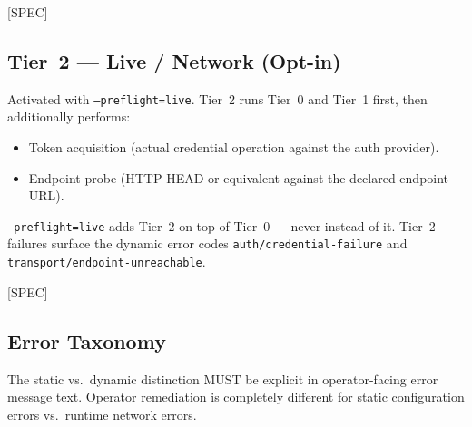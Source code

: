 [SPEC]

\subsection{Tier~2 — Live / Network (Opt-in)}
\label{subsec:rp-preflight-t2}

Activated with \texttt{--preflight=live}.  Tier~2 runs Tier~0 and Tier~1
first, then additionally performs:

\begin{itemize}[noitemsep]
  \item Token acquisition (actual credential operation against the auth
        provider).
  \item Endpoint probe (HTTP HEAD or equivalent against the declared
        endpoint URL).
\end{itemize}

\texttt{--preflight=live} adds Tier~2 on top of Tier~0 — never instead of it.
Tier~2 failures surface the dynamic error codes \texttt{auth/credential-failure}
and \texttt{transport/endpoint-unreachable}.

[SPEC]

\subsection{Error Taxonomy}
\label{subsec:rp-error-taxonomy}

The static vs.\ dynamic distinction MUST be explicit in operator-facing error
message text.  Operator remediation is completely different for static
configuration errors vs.\ runtime network errors.

